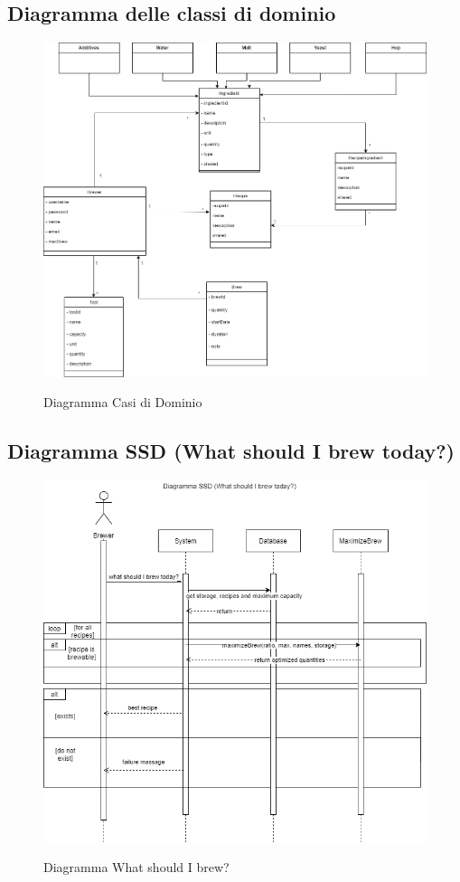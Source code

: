 \documentclass{article}
\begin{document}
\subsection{Diagramma delle classi di dominio}
\begin{figure}[h!]
\centering
\includegraphics[scale=0.4]{Diagramma di Dominio.png}
\label{fig:Diagramma Casi di Dominio}
\caption{Diagramma Casi di Dominio}
\end{figure}
\clearpage
\subsection{Diagramma SSD (What should I brew today?)}
\begin{figure}[h!]
\centering
\includegraphics[scale=0.5]{Diagramma SSD (1).png}
\label{fig:Diagramma What should I brew?}
\caption{Diagramma What should I brew?}
\end{figure}
\clearpage
\end{document}
